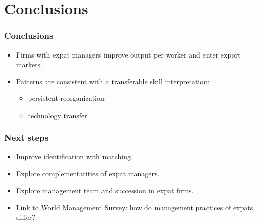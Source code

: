 \documentclass[aspectratio=169,compress,mathserif]{beamer}
\begin{document}
\section{Conclusions}\hypertarget{Conclusions}{}
\begin{frame}\frametitle{Conclusions}\hypertarget{Conclusions}{}
\begin{itemize}
\item Firms with expat managers improve output per worker and enter export markets.

\item Patterns are consistent with a transferable skill interpretation:
\begin{itemize}
\item persistent reorganization

\item technology transfer


\end{itemize}

\end{itemize}
\end{frame}



\begin{frame}\frametitle{Next steps}\hypertarget{Next steps}{}
\begin{itemize}
\item Improve identification with matching.

\item Explore complementarities of expat managers.

\item Explore management team and succession in expat firms.

\item Link to World Management Survey: how do management practices of expats differ?
\end{itemize}
\end{frame}
\end{document}
